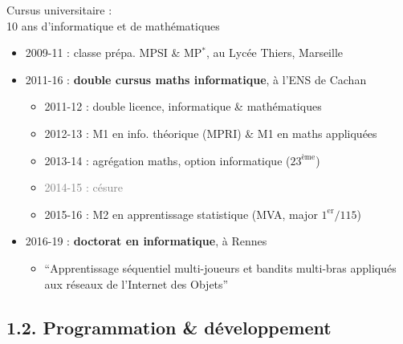 \documentclass[11pt,english,ignorenonframetext,]{beamer}
\providecommand{\tightlist}{%
  \setlength{\itemsep}{0pt}\setlength{\parskip}{0pt}}
\begin{document}
\begin{frame}{Cursus universitaire :\\
  10 ans d'\textcolor{info}{informatique} et de \textcolor{maths}{mathématiques}}

\pause

\begin{itemize}
\tightlist
\item
  2009-11 : classe prépa. \textcolor{maths}{M}PSI \& \textcolor{maths}{M}P\(^*\), au Lycée Thiers, Marseille

\vspace*{10pt}
\pause
\item
  2011-16 : \textbf{double cursus \textcolor{maths}{maths} \textcolor{info}{informatique}}, à l'ENS de Cachan

  \begin{itemize}[<+->]
  \tightlist
  \item
    2011-12 : double licence, \textcolor{info}{informatique} \& \textcolor{maths}{mathématiques}
  \item
    2012-13 : M1 en \textcolor{info}{info. théorique} (MPRI) \& M1 en \textcolor{maths}{maths appliquées}
  \item
    2013-14 : \textcolor{maths}{agrégation maths}, \textcolor{info}{option informatique} ($23^{\text{ème}}$)
  \item
    \textcolor{gray}{2014-15 : césure}
  \item
    2015-16 : M2 en \textcolor{ml}{apprentissage statistique} (MVA, major $1^{\text{er}}/115$)
  \end{itemize}

\pause
\vspace*{10pt}
  \item
  2016-19 : \textbf{doctorat en \textcolor{info}{informatique}}, à Rennes

  \begin{itemize}
  \tightlist
  \item
    ``\textcolor{ml}{Apprentissage séquentiel} multi-joueurs et bandits multi-bras
    appliqués aux réseaux de l'Internet des Objets''
  \end{itemize}
\end{itemize}

\end{frame}


\subsection{\hfill{}1.2. Programmation \& développement\hfill{}}
\end{document}
